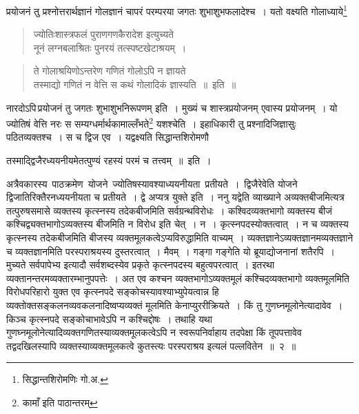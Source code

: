\documentclass[11pt, openany]{book}
\begin{document}
 प्रयोजनं तु प्रश्नोत्तरार्थज्ञानं गोलज्ञानं चापरं परम्परया जगतः
शुभाशुभफलादेश्च~। यतो वक्ष्यति गोलाध्याये\renewcommand{\thefootnote}{1}\footnote{सिद्धान्तशिरोमणिः गो.अ.}
\begin{quote}
    \q
    ज्योतिःशास्त्रफलं पुराणगणकैरादेश इत्युच्यते\\
 नूनं लग्नबलाश्रितः पुनरयं तत्स्पष्टखेटाश्रयम्~।
\end{quote}
 \newpage 
\begin{quote}
    \q
    ते गोलाश्रयिणोऽन्तरेण गणितं गोलोऽपि न ज्ञायते \\
 तस्माद्यो गणितं न वेत्ति स कथं गोलादिकं ज्ञास्यति~॥~इति~॥
\end{quote}
 
नारदोऽपि\textendash \,प्रयोजनं तु जगतः शुभाशुभनिरूपणम् इति~। मुख्यं च शास्त्रप्रयोजनम् एवास्य प्रयोजनम्~। यो ज्योतिषं वेत्ति नरः स
सम्यग्धर्मार्थकामाल्लँभते\renewcommand{\thefootnote}{१}\footnote{कामाँ इति पाठान्तरम्}
यशश्चेति~। इहाधिकारी तु प्रश्नादिजिज्ञासुः पठितव्यक्तश्च~। स च द्विज
एव~। यद्वक्ष्यति सिद्धान्तशिरोमणौ\textendash \\
\vspace{-2mm}

{\q तस्माद्द्विजैरध्ययनीयमेतत्पुण्यं रहस्यं परमं च तत्त्वम्~॥~इति~। }\\
\vspace{-2mm}

\noindent अत्रैवकारस्य \,पाठक्रमेण \,योजने \,ज्योतिषस्यावश्याध्ययनीयता \,प्रतीयते~। \,द्विजैरेवेति योजने द्विजातिरिक्तैरनध्ययनीयता च प्रतीयते~। द्वे अप्यत्र
युक्ते इति~। ननु यद्वेति व्याख्याने अव्यक्तबीजमित्यत्र तत्पुरुषसमासे
व्यक्तस्य कृत्स्नस्य तदेकबीजमिति सर्वग्रन्थविरोधः~। कश्विदव्यक्तभागो व्यक्तस्य
बीजं कश्चिद्व्यक्तभागोऽव्यक्तस्य बीजमिति न विरोध इति चेत्~। न~।
कृत्स्नपदस्योक्तत्वात्~। न च व्यक्तस्य कृत्स्नस्य तदेकबीजमिति बीजस्य
व्यक्तमूलकत्वेऽप्यविरुद्धामिति वाच्यम्~। व्यक्तज्ञानेऽव्यक्तज्ञानमव्यक्तज्ञाने च
व्यक्तज्ञानमिति परस्पराश्रयस्य दुस्तरत्वात्~। मैवम्~। {\qt गङ्गा गङ्गेति यो
ब्रूयाद्योजनानां शतैरपि~। मुच्यते सर्वपापेभ्य} इत्यादौ सर्वशब्दस्येव प्रकृते कृत्स्नपदस्य
बहुत्वपरत्वात्~। इतरथा व्यक्तानन्तरमव्यक्तारम्भानुपपत्तेः~। अत एव कश्चन
व्यक्तभागोऽव्यक्तमूलं कश्चिदव्यक्तभागो व्यक्तमूलमिति विरोधपरिहारो
युक्त एव कृत्स्नपदे सङ्कोचस्यावश्याभ्युपेयत्वान्न हि
व्यक्तोक्तसङ्कलनव्यवकलनादिष्वप्यव्यक्तं मूलमिति केनाप्युररीक्रियते~। 
किं तु गुणघ्नमूलोनेत्यादावेव~।
किञ्च कृत्स्नपदे सङ्कोचाभावेऽपि न कश्चिद्दोषः~। तथाहि यथा
गुणघ्नमूलोनेत्यादिव्यक्तगणितस्याव्यक्तमूलकत्वेऽपि न स्वरूपनिर्वाहाय तदपेक्षा किं
तूपपत्तावेव तद्वदखिलस्यापि व्यक्तस्याव्यक्तमूलकत्वे कुतस्त्यः परस्पराश्रय इत्यलं
पल्लवितेन~॥~२~॥~\\
\end{document}
